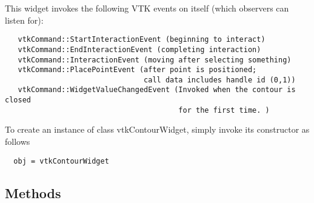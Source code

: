  This widget invokes the following VTK events on itself (which observers
 can listen for):
 \begin{verbatim}
   vtkCommand::StartInteractionEvent (beginning to interact)
   vtkCommand::EndInteractionEvent (completing interaction)
   vtkCommand::InteractionEvent (moving after selecting something)
   vtkCommand::PlacePointEvent (after point is positioned; 
                                call data includes handle id (0,1))
   vtkCommand::WidgetValueChangedEvent (Invoked when the contour is closed
                                        for the first time. )
 \end{verbatim}

To create an instance of class vtkContourWidget, simply
invoke its constructor as follows
\begin{verbatim}
  obj = vtkContourWidget
\end{verbatim}
\subsection{Methods}

